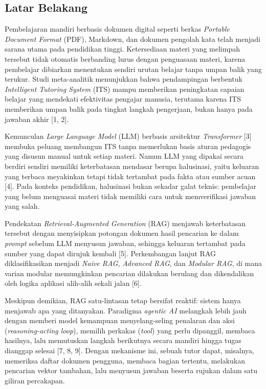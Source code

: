 \documentclass[12pt,a4paper]{article}
\begin{document}
\subsection*{Latar Belakang}
Pembelajaran mandiri berbasis dokumen digital seperti berkas \textit{Portable Document Format} (PDF), Markdown, dan dokumen pengolah kata telah menjadi sarana utama pada pendidikan tinggi. Ketersediaan materi yang melimpah tersebut tidak otomatis berbanding lurus dengan penguasaan materi, karena pembelajar dibiarkan menentukan sendiri urutan belajar tanpa umpan balik yang terukur. Studi meta-analitik menunjukkan bahwa pendampingan berbentuk \textit{Intelligent Tutoring System} (ITS) mampu memberikan peningkatan capaian belajar yang mendekati efektivitas pengajar manusia, terutama karena ITS memberikan umpan balik pada tingkat langkah pengerjaan, bukan hanya pada jawaban akhir {[}1, 2{]}.

Kemunculan \textit{Large Language Model} (LLM) berbasis arsitektur \textit{Transformer} {[}3{]} membuka peluang membangun ITS tanpa memerlukan basis aturan pedagogis yang disusun manual untuk setiap materi. Namun LLM yang dipakai secara berdiri sendiri memiliki keterbatasan mendasar berupa halusinasi, yaitu keluaran yang terbaca meyakinkan tetapi tidak tertambat pada fakta atau sumber acuan {[}4{]}. Pada konteks pendidikan, halusinasi bukan sekadar galat teknis: pembelajar yang belum menguasai materi tidak memiliki cara untuk memverifikasi jawaban yang salah.

Pendekatan \textit{Retrieval-Augmented Generation} (RAG) menjawab keterbatasan tersebut dengan menyisipkan potongan dokumen hasil pencarian ke dalam \textit{prompt} sebelum LLM menyusun jawaban, sehingga keluaran tertambat pada sumber yang dapat dirujuk kembali {[}5{]}. Perkembangan lanjut RAG diklasifikasikan menjadi \textit{Naive RAG}, \textit{Advanced RAG}, dan \textit{Modular RAG}, di mana varian modular memungkinkan pencarian dilakukan berulang dan dikendalikan oleh logika aplikasi alih-alih sekali jalan {[}6{]}.

Meskipun demikian, RAG satu-lintasan tetap bersifat reaktif: sistem hanya menjawab apa yang ditanyakan. Paradigma \textit{agentic AI} melangkah lebih jauh dengan memberi model kemampuan menyelang-seling penalaran dan aksi (\textit{reasoning-acting loop}), memilih perkakas (\textit{tool}) yang perlu dipanggil, membaca hasilnya, lalu memutuskan langkah berikutnya secara mandiri hingga tugas dianggap selesai {[}7, 8, 9{]}. Dengan mekanisme ini, sebuah tutor dapat, misalnya, memeriksa daftar dokumen pengguna, membaca bagian tertentu, melakukan pencarian vektor tambahan, lalu menyusun jawaban beserta rujukan dalam satu giliran percakapan.
\end{document}
